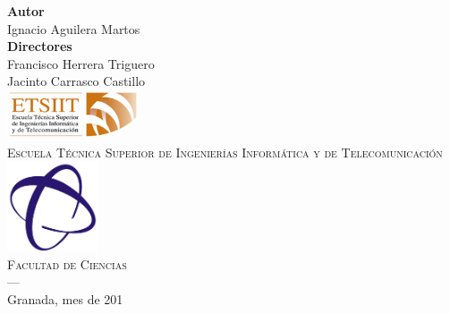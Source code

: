 \begin{titlepage}
\begin{minipage}{\textwidth}
\textbf{Autor}\\ {Ignacio Aguilera Martos}\\[2.5ex]
\textbf{Directores}\\
{Francisco Herrera Triguero\\
Jacinto Carrasco Castillo}\\[2cm]
\includegraphics[width=0.3\textwidth]{imagenes/logos/etsiit_logo.png}\\[0.1cm]
\textsc{Escuela Técnica Superior de Ingenierías Informática y de Telecomunicación}\\
\includegraphics[width=0.2\textwidth]{imagenes/logos/ciencias.png}\\[0.1cm]
\textsc{Facultad de Ciencias}\\
\textsc{---}\\
Granada, mes de 201
\end{minipage}
\end{titlepage}


